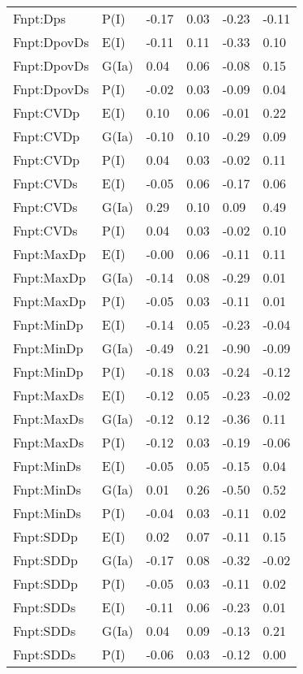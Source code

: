 \begin{center}
\begin{longtable}{|p{1.1in}|p{0.7in}|p{0.7in}|p{0.6in}|p{0.6in}|p{0.6in}|}
  Fnpt:Dps & P(I) & -0.17 & 0.03 & -0.23 & -0.11 \\ 
  Fnpt:DpovDs & E(I) & -0.11 & 0.11 & -0.33 & 0.10 \\ 
  Fnpt:DpovDs & G(Ia) & 0.04 & 0.06 & -0.08 & 0.15 \\ 
  Fnpt:DpovDs & P(I) & -0.02 & 0.03 & -0.09 & 0.04 \\ 
  Fnpt:CVDp & E(I) & 0.10 & 0.06 & -0.01 & 0.22 \\ 
  Fnpt:CVDp & G(Ia) & -0.10 & 0.10 & -0.29 & 0.09 \\ 
  Fnpt:CVDp & P(I) & 0.04 & 0.03 & -0.02 & 0.11 \\ 
  Fnpt:CVDs & E(I) & -0.05 & 0.06 & -0.17 & 0.06 \\ 
  Fnpt:CVDs & G(Ia) & 0.29 & 0.10 & 0.09 & 0.49 \\ 
  Fnpt:CVDs & P(I) & 0.04 & 0.03 & -0.02 & 0.10 \\ 
  Fnpt:MaxDp & E(I) & -0.00 & 0.06 & -0.11 & 0.11 \\ 
  Fnpt:MaxDp & G(Ia) & -0.14 & 0.08 & -0.29 & 0.01 \\ 
  Fnpt:MaxDp & P(I) & -0.05 & 0.03 & -0.11 & 0.01 \\ 
  Fnpt:MinDp & E(I) & -0.14 & 0.05 & -0.23 & -0.04 \\ 
  Fnpt:MinDp & G(Ia) & -0.49 & 0.21 & -0.90 & -0.09 \\ 
  Fnpt:MinDp & P(I) & -0.18 & 0.03 & -0.24 & -0.12 \\ 
  Fnpt:MaxDs & E(I) & -0.12 & 0.05 & -0.23 & -0.02 \\ 
  Fnpt:MaxDs & G(Ia) & -0.12 & 0.12 & -0.36 & 0.11 \\ 
  Fnpt:MaxDs & P(I) & -0.12 & 0.03 & -0.19 & -0.06 \\ 
  Fnpt:MinDs & E(I) & -0.05 & 0.05 & -0.15 & 0.04 \\ 
  Fnpt:MinDs & G(Ia) & 0.01 & 0.26 & -0.50 & 0.52 \\ 
  Fnpt:MinDs & P(I) & -0.04 & 0.03 & -0.11 & 0.02 \\ 
  Fnpt:SDDp & E(I) & 0.02 & 0.07 & -0.11 & 0.15 \\ 
  Fnpt:SDDp & G(Ia) & -0.17 & 0.08 & -0.32 & -0.02 \\ 
  Fnpt:SDDp & P(I) & -0.05 & 0.03 & -0.11 & 0.02 \\ 
  Fnpt:SDDs & E(I) & -0.11 & 0.06 & -0.23 & 0.01 \\ 
  Fnpt:SDDs & G(Ia) & 0.04 & 0.09 & -0.13 & 0.21 \\ 
  Fnpt:SDDs & P(I) & -0.06 & 0.03 & -0.12 & 0.00 \\ 

\end{longtable}
\end{center}
